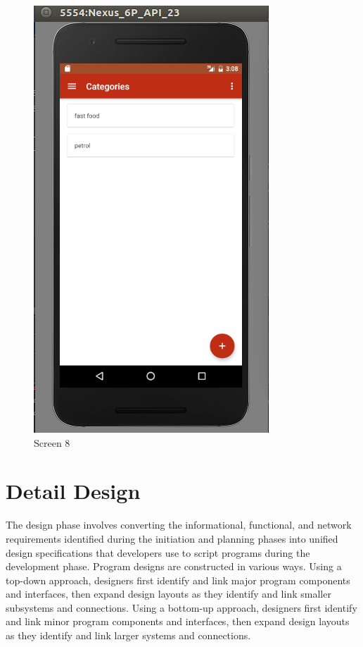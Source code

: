 \begin{figure}[ht]
\centering
\includegraphics[scale=0.38]{images/s8.png}
\caption{Screen 8}
\label{fig:8}
\end{figure}
\fi

\section{Detail Design}
The design phase involves converting the informational, functional, and network requirements identified during the initiation and planning phases into unified design specifications that developers use to script programs during the development phase. Program designs are constructed in various ways. Using a top-down approach, designers first identify and link major program components and interfaces, then expand design layouts as they identify and link smaller subsystems and connections. Using a bottom-up approach, designers first identify and link minor program components and interfaces, then expand design layouts as they identify and link larger systems and connections.
 
